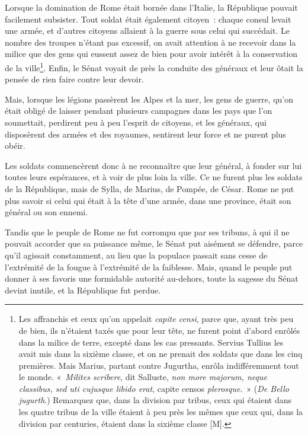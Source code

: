 \documentclass[french,twoside]{book} %
\newcommand\chaptercont{} %
\begin{document}
\chaptercont
\noindent Lorsque la domination de Rome était bornée dans l’Italie, la République pouvait facilement subsister. Tout soldat était également citoyen : chaque consul levait une armée, et d’autres citoyens allaient à la guerre sous celui qui succédait. Le nombre des troupes n’étant pas excessif, on avait attention à ne recevoir dans la milice que des gens qui eussent assez de bien pour avoir intérêt à la conservation de la ville\footnote{Les affranchis et ceux qu’on appelait {\itshape capite censi}, parce que, ayant très peu de bien, ils n’étaient taxés que pour leur tête, ne furent point d’abord enrôlés dans la milice de terre, excepté dans les cas pressants. Servius Tullius les avait mis dans la sixième classe, et on ne prenait des soldats que dans les cinq premières. Mais Marius, partant contre Jugurtha, enrôla indifféremment tout le monde. « {\itshape Milites scribere}, dit Salluste, {\itshape non more majorum, neque classibus, sed uti cujusque libido erat}, capite censos {\itshape plerosque}. » ({\itshape De Bello jugurth}.) Remarquez que, dans la division par tribus, ceux qui étaient dans les quatre tribus de la ville étaient à peu près les mêmes que ceux qui, dans la division par centuries, étaient dans la sixième classe [M].}. Enfin, le Sénat voyait de près la conduite des généraux et leur ôtait la pensée de rien faire contre leur devoir.\par
Mais, lorsque les légions passèrent les Alpes et la mer, les gens de guerre, qu’on était obligé de laisser pendant plusieurs campagnes dans les pays que l’on soumettait, perdirent peu à peu l’esprit de citoyens, et les généraux, qui disposèrent des armées et des royaumes, sentirent leur force et ne purent plus obéir.\par
Les soldats commencèrent donc à ne reconnaître que leur général, à fonder sur lui toutes leurs espérances, et à voir de plus loin la ville. Ce ne furent plus les soldats de la République, mais de Sylla, de Marius, de Pompée, de César. Rome ne put plus savoir si celui qui était à la tête d’une armée, dans une province, était son général ou son ennemi.\par
Tandis que le peuple de Rome ne fut corrompu que par ses tribuns, à qui il ne pouvait accorder que sa puissance même, le Sénat put aisément se défendre, parce qu’il agissait constamment, au lieu que la populace passait sans cesse de l’extrémité de la fougue à l’extrémité de la faiblesse. Mais, quand le peuple put donner à ses favoris une formidable autorité au-dehors, toute la sagesse du Sénat devint inutile, et la République fut perdue.\par
\end{document}
